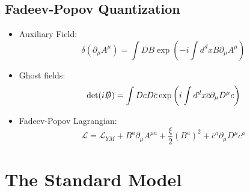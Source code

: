 \documentclass[11pt, oneside]{article}   	%
\theoremstyle{definition}
\begin{document}
\subsection*{Fadeev-Popov Quantization}

\begin{itemize}

	\item Auxiliary Field:
	$$
		\delta(\partial_\mu A^\mu) = \int DB \exp\left(-i\int d^dx B\partial_\mu A^\mu\right)
	$$
	
	\item Ghost fields:
	$$
		\det(i\slashed D) = \int Dc D\overline c\exp\left( i\int d^dx\overline c\partial_\mu D^\mu c\right)
	$$
	
	\item Fadeev-Popov Lagrangian:
	$$
		\mathcal L = \mathcal L_{YM} + B^a\partial_\mu A^{\mu a} + \frac{\xi}{2}(B^a)^2+ \overline c^a\partial_\mu 
		D^\mu c^a
	$$
	
\end{itemize}

\section*{The Standard Model}
\end{document}
